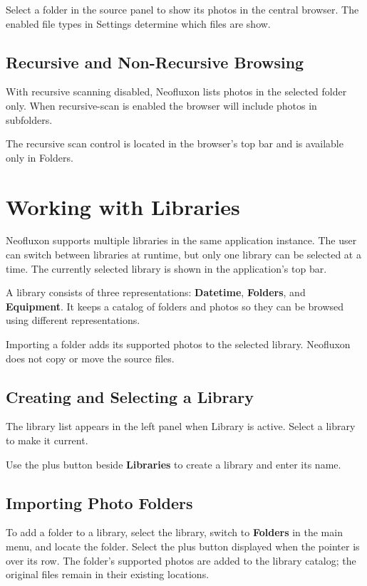 \documentclass[11pt]{article}
\begin{document}
Select a folder in the source panel to show its photos in the
central browser. The enabled file types in Settings determine which files
are show.

\subsection{Recursive and Non-Recursive Browsing}

With recursive scanning disabled, Neofluxon lists photos in the selected
folder only. When recursive-scan is enabled the browser will include
photos in subfolders.

The recursive scan control is located in the browser's
top bar and is available only in Folders.

\section{Working with Libraries}

Neofluxon supports multiple libraries in the same application instance.
The user can switch between libraries at runtime, but only one library
can be selected at a time. The currently selected library is
shown in the application's top bar.

A library consists of three representations: \textbf{Datetime}, \textbf{Folders}, and \textbf{Equipment}.
It keeps a catalog of folders and photos so they can be browsed
using different representations.

Importing a folder adds its supported photos to the selected library.
Neofluxon does not copy or move the source files.

\subsection{Creating and Selecting a Library}

The library list appears in the left panel when Library is active.
Select a library to make it current.

Use the plus button beside \textbf{Libraries} to create a library and enter
its name.

\subsection{Importing Photo Folders}

To add a folder to a library, select the library, switch to
\textbf{Folders} in the main menu, and locate the folder. Select the plus button displayed
when the pointer is over its row. The folder's supported photos are added to
the library catalog; the original files remain in their existing locations.
\end{document}
